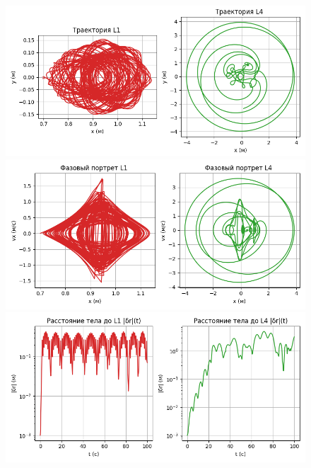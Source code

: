 \documentclass[12pt]{article}
\begin{document}
\begin{figure}[H]
  \centering
  \includegraphics[width=1\textwidth]{Figure_111.png}
  \includegraphics[width=1\textwidth]{Figure_222.png}
  \includegraphics[width=1\textwidth]{Figure_333.png}
\end{figure}
\end{document}

